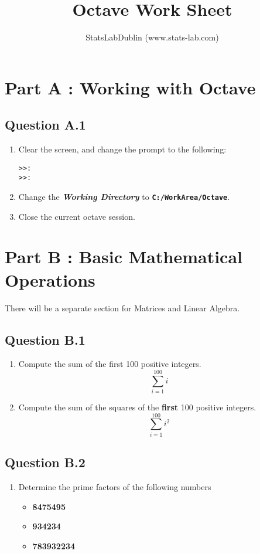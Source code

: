 \documentclass[12pt]{article}
\title{Octave Work Sheet}
\author{StatsLabDublin  (www.stats-lab.com)}
\begin{document}
\maketitle

\section*{Part A : Working with Octave}
\subsection*{Question A.1}
\begin{enumerate}
\item Clear the screen, and change the prompt to the following:
\begin{framed}
\begin{verbatim}
>>:
>>:
\end{verbatim}
\end{framed}
\item Change the \textbf{\textit{Working Directory}} to \textbf{\texttt{C:/WorkArea/Octave}}.
\item Close the current octave session.
\end{enumerate}
\newpage

\section*{Part B : Basic Mathematical Operations}
There will be a separate section for Matrices and Linear Algebra.

\subsection*{Question B.1}
\begin{enumerate}
\item Compute the sum of the first 100 positive integers.
\[ \sum^{100}_{i=1} i \]
\item Compute the sum of the squares of the \textbf{first} 100 positive integers.
\[ \sum^{100}_{i=1} i^2 \]
\end{enumerate}
\subsection*{Question B.2}
\begin{enumerate}
\item Determine the prime factors of the following numbers
\begin{itemize}
\item \textbf{8475495}
\item \textbf{934234}
\item \textbf{783932234}
\end{itemize}
\end{enumerate}
\end{document}
